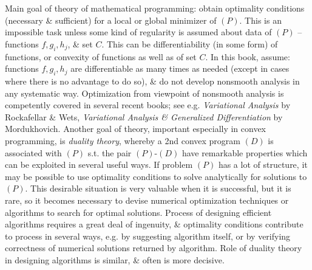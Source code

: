 \documentclass{article}
\begin{document}
\begin{itemize}
    Main goal of theory of mathematical programming: obtain optimality conditions (necessary \& sufficient) for a local or global minimizer of $(P)$. This is an impossible task unless some kind of regularity is assumed about data of $(P)$ -- functions $f,g_i,h_j$, \& set $C$. This can be differentiability (in some form) of functions, or convexity of functions as well as of set $C$. In this book, assume: functions $f,g_i,h_j$ are differentiable as many times as needed (except in cases where there is no advantage to do so), \& do not develop nonsmooth analysis in any systematic way. Optimization from viewpoint of nonsmooth analysis is competently covered in several recent books; see e.g. {\it Variational Analysis} by {\sc Rockafellar \& Wets}, {\it Variational Analysis \& Generalized Differentiation} by {\sc Mordukhovich}. Another goal of theory, important especially in convex programming, is {\it duality theory}, whereby a 2nd convex program $(D)$ is associated with $(P)$ s.t. the pair $(P)$-$(D)$ have remarkable properties which can be exploited in several useful ways. If problem $(P)$ has a lot of structure, it may be possible to use optimality conditions to solve analytically for solutions to $(P)$. This desirable situation is very valuable when it is successful, but it is rare, so it becomes necessary to devise numerical optimization techniques or algorithms to search for optimal solutions. Process of designing efficient algorithms requires a great deal of ingenuity, \& optimality conditions contribute to process in several ways, e.g. by suggesting algorithm itself, or by verifying correctness of numerical solutions returned by algorithm. Role of duality theory in designing algorithms is similar, \& often is more decisive.
    

\end{itemize}
\end{document}
